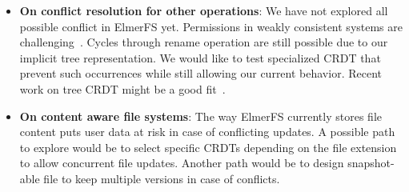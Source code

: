 \documentclass[sigconf, anonymous, 10pt]{acmart}
\begin{document}
\begin{itemize}
    \item \textbf{On conflict resolution for other operations}: We have not explored all possible conflict in ElmerFS yet.
    Permissions in weakly consistent systems are challenging~\cite{yanakieva2021access}.
    Cycles through rename operation are still possible due to our implicit tree representation.
    We would like to test specialized CRDT that prevent such occurrences while still allowing our current behavior. Recent work on tree CRDT might be a good fit~\cite{nair:hal-03150817}.

    \item \textbf{On content aware file systems}: The way ElmerFS currently stores file content puts user data at risk in case of conflicting updates. A possible path to explore would be to select specific CRDTs depending on the file extension to allow concurrent file updates. Another path would be to design snapshot-able file to keep multiple versions in case of conflicts.
\end{itemize}






\end{document}
